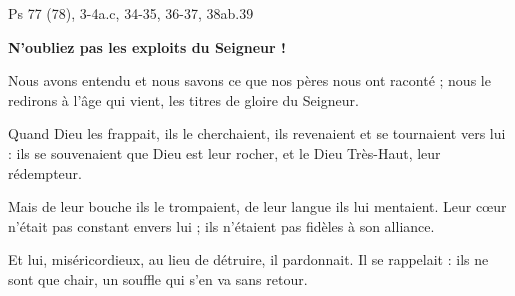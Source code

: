 Ps 77 (78), 3-4a.c, 34-35, 36-37, 38ab.39

\textbf{N’oubliez pas les exploits du Seigneur !}


Nous avons entendu et nous savons
ce que nos pères nous ont raconté ;
nous le redirons à l’âge qui vient,
les titres de gloire du Seigneur.


Quand Dieu les frappait, ils le cherchaient,
ils revenaient et se tournaient vers lui :
ils se souvenaient que Dieu est leur rocher,
et le Dieu Très-Haut, leur rédempteur.


Mais de leur bouche ils le trompaient,
de leur langue ils lui mentaient.
Leur cœur n’était pas constant envers lui ;
ils n’étaient pas fidèles à son alliance.


Et lui, miséricordieux,
au lieu de détruire, il pardonnait.
Il se rappelait : ils ne sont que chair,
un souffle qui s’en va sans retour.

